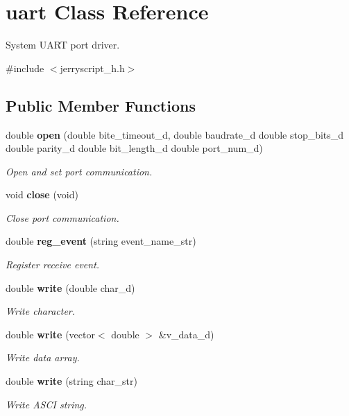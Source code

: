\section{uart Class Reference}
\label{classuart}


System U\+A\+RT port driver.  




{\ttfamily \#include $<$jerryscript\+\_\+h.\+h$>$}

\subsection*{Public Member Functions}
\begin{DoxyCompactItemize}
\item 
double \textbf{ open} (double bite\+\_\+timeout\+\_\+d, double baudrate\+\_\+d double stop\+\_\+bits\+\_\+d double parity\+\_\+d double bit\+\_\+length\+\_\+d double port\+\_\+num\+\_\+d)
\begin{DoxyCompactList}\small\item\em Open and set port communication. \end{DoxyCompactList}\item 
void \textbf{ close} (void)
\begin{DoxyCompactList}\small\item\em Close port communication. \end{DoxyCompactList}\item 
double \textbf{ reg\+\_\+event} (string event\+\_\+name\+\_\+str)
\begin{DoxyCompactList}\small\item\em Register receive event. \end{DoxyCompactList}\item 
double \textbf{ write} (double char\+\_\+d)
\begin{DoxyCompactList}\small\item\em Write character. \end{DoxyCompactList}\item 
double \textbf{ write} (vector$<$ double $>$ \&v\+\_\+data\+\_\+d)
\begin{DoxyCompactList}\small\item\em Write data array. \end{DoxyCompactList}\item 
double \textbf{ write} (string char\+\_\+str)
\begin{DoxyCompactList}\small\item\em Write A\+S\+CI string. \end{DoxyCompactList}\item 

\end{DoxyCompactItemize}
